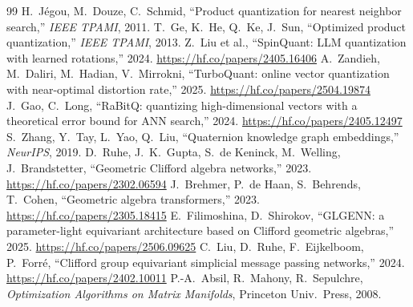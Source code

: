 \documentclass[11pt]{article}
\begin{document}
\begin{thebibliography}{99}
\small
{} H.~J\'egou, M.~Douze, C.~Schmid, ``Product quantization for nearest neighbor search,'' \emph{IEEE TPAMI}, 2011.
 T.~Ge, K.~He, Q.~Ke, J.~Sun, ``Optimized product quantization,'' \emph{IEEE TPAMI}, 2013.
 Z.~Liu et al., ``SpinQuant: LLM quantization with learned rotations,'' 2024. \url{https://hf.co/papers/2405.16406}
 A.~Zandieh, M.~Daliri, M.~Hadian, V.~Mirrokni, ``TurboQuant: online vector quantization with near-optimal distortion rate,'' 2025. \url{https://hf.co/papers/2504.19874}
 J.~Gao, C.~Long, ``RaBitQ: quantizing high-dimensional vectors with a theoretical error bound for ANN search,'' 2024. \url{https://hf.co/papers/2405.12497}
 S.~Zhang, Y.~Tay, L.~Yao, Q.~Liu, ``Quaternion knowledge graph embeddings,'' \emph{NeurIPS}, 2019.
 D.~Ruhe, J.~K.~Gupta, S.~de Keninck, M.~Welling, J.~Brandstetter, ``Geometric Clifford algebra networks,'' 2023. \url{https://hf.co/papers/2302.06594}
 J.~Brehmer, P.~de Haan, S.~Behrends, T.~Cohen, ``Geometric algebra transformers,'' 2023. \url{https://hf.co/papers/2305.18415}
 E.~Filimoshina, D.~Shirokov, ``GLGENN: a parameter-light equivariant architecture based on Clifford geometric algebras,'' 2025. \url{https://hf.co/papers/2506.09625}
 C.~Liu, D.~Ruhe, F.~Eijkelboom, P.~Forr\'e, ``Clifford group equivariant simplicial message passing networks,'' 2024. \url{https://hf.co/papers/2402.10011}
 P.-A.~Absil, R.~Mahony, R.~Sepulchre, \emph{Optimization Algorithms on Matrix Manifolds}, Princeton Univ.\ Press, 2008.
\end{thebibliography}
\end{document}
